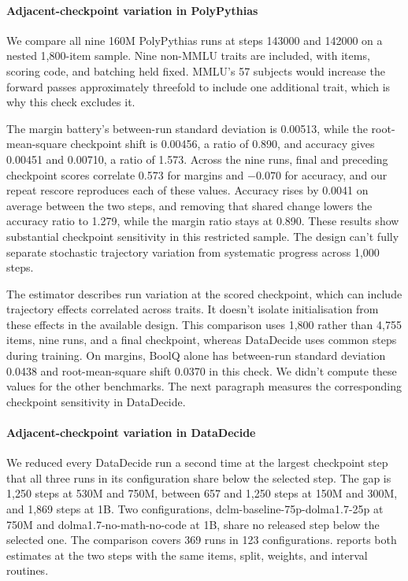 \paragraph{Adjacent-checkpoint variation in PolyPythias}
We compare all nine 160M PolyPythias runs at steps 143000 and 142000 on a nested 1,800-item sample. Nine non-MMLU traits are included, with items, scoring code, and batching held fixed. MMLU's 57 subjects would increase the forward passes approximately threefold to include one additional trait, which is why this check excludes it.

The margin battery's between-run standard deviation is 0.00513, while the root-mean-square checkpoint shift is 0.00456, a ratio of 0.890, and accuracy gives 0.00451 and 0.00710, a ratio of 1.573. Across the nine runs, final and preceding checkpoint scores correlate 0.573 for margins and $-0.070$ for accuracy, and our repeat rescore reproduces each of these values. Accuracy rises by 0.0041 on average between the two steps, and removing that shared change lowers the accuracy ratio to 1.279, while the margin ratio stays at 0.890. These results show substantial checkpoint sensitivity in this restricted sample. The design can't fully separate stochastic trajectory variation from systematic progress across 1,000 steps.

The estimator describes run variation at the scored checkpoint, which can include trajectory effects correlated across traits. It doesn't isolate initialisation from these effects in the available design. This comparison uses 1,800 rather than 4,755 items, nine runs, and a final checkpoint, whereas DataDecide uses common steps during training. On margins, BoolQ alone has between-run standard deviation 0.0438 and root-mean-square shift 0.0370 in this check. We didn't compute these values for the other benchmarks. The next paragraph measures the corresponding checkpoint sensitivity in DataDecide.

\paragraph{Adjacent-checkpoint variation in DataDecide}
\label{app:checkpoint}
We reduced every DataDecide run a second time at the largest checkpoint step that all three runs in its configuration share below the selected step. The gap is 1,250 steps at 530M and 750M, between 657 and 1,250 steps at 150M and 300M, and 1,869 steps at 1B. Two configurations, dclm-baseline-75p-dolma1.7-25p at 750M and dolma1.7-no-math-no-code at 1B, share no released step below the selected one. The comparison covers 369 runs in 123 configurations.  reports both estimates at the two steps with the same items, split, weights, and interval routines.

